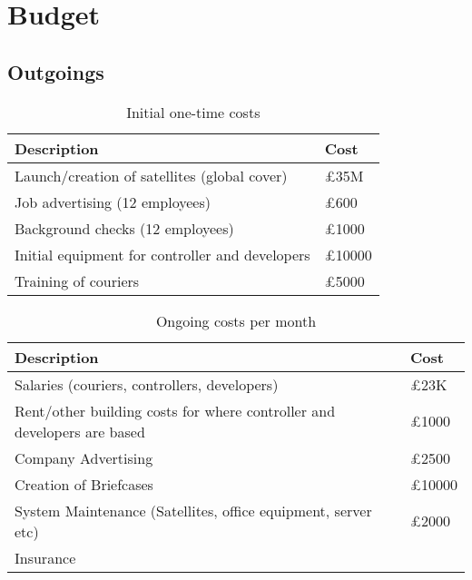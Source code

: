 \section{Budget}

\subsection{Outgoings}

\begin{table}[H]
    \centering
    \begin{tabular}{|p{}|p{}|}
        \hline
        \textbf{Description} & \textbf{Cost} \\
        \hline
        Launch/creation of satellites (global cover) & £35M \\
        \hline
        Job advertising (12 employees) & £600\\
        \hline
        Background checks (12 employees) & £1000 \\
        \hline
        Initial equipment for controller and developers & £10000\\
        \hline
        Training of couriers & £5000\\
        \hline
    \end{tabular}
    \caption{Initial one-time costs}
    \label{tab:initialCosts}
\end{table}

\begin{table}[H]
    \centering
    \begin{tabular}{|p{}|p{}|}
        \hline
        \textbf{Description} & \textbf{Cost} \\
        \hline
        Salaries (couriers, controllers, developers) & £23K\\
        \hline
        Rent/other building costs for where controller and developers are based & £1000\\
        \hline
        Company Advertising & £2500\\
        \hline
        Creation of Briefcases & £10000\\
        \hline
        System Maintenance (Satellites, office equipment, server etc) & £2000\\
        \hline
        Insurance & \\
        \hline
    \end{tabular}
    \caption{Ongoing costs per month}
    \label{tab:ongoingCosts}
\end{table}

